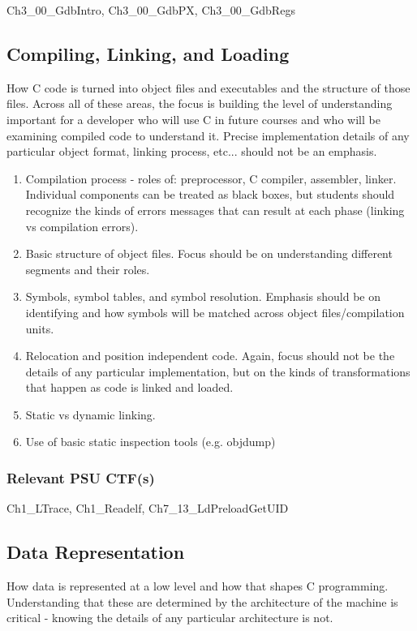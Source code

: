 \documentclass[12pt,letterpaper]{article}
\begin{document}
	Ch3\_00\_GdbIntro, Ch3\_00\_GdbPX, Ch3\_00\_GdbRegs


	\subsection{Compiling, Linking, and Loading}

	How C code is turned into object files and executables and the structure of those files. Across all of these areas, the focus is building the level of understanding important for a developer who will use C in future courses and who will be examining compiled code to understand it. Precise implementation details of any particular object format, linking process, etc... should not be an emphasis.

	\begin{enumerate}
		\item Compilation process - roles of: preprocessor, C compiler, assembler, linker. Individual components can be treated as black boxes, but students should recognize the kinds of errors messages that can result at each phase (linking vs compilation errors). 
		\item Basic structure of object files. Focus should be on understanding different segments and their roles.
		\item Symbols, symbol tables, and symbol resolution.  Emphasis should be on identifying and how symbols will be matched across object files/compilation units. 
		\item Relocation and position independent code. Again, focus should not be the details of any particular implementation, but on the kinds of transformations that happen as code is linked and loaded.
		\item Static vs dynamic linking. 
		\item Use of basic static inspection tools (e.g. objdump)
	\end{enumerate}

	\subsubsection*{Relevant PSU CTF(s)}

	Ch1\_LTrace, Ch1\_Readelf, Ch7\_13\_LdPreloadGetUID


	\subsection{Data Representation}

	How data is represented at a low level and how that shapes C programming. Understanding that these are determined by the architecture of the machine is critical - knowing the details of any particular architecture is not.
\end{document}
